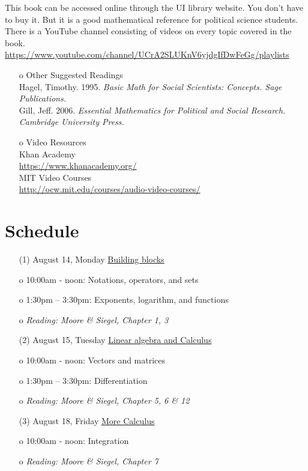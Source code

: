 \documentclass[11pt, a4paper]{article}
\begin{document}
This book can be accessed online through the UI library website. You don't have to buy it. But it is a good mathematical reference for political science students. There is a YouTube channel consisting of videos on every topic covered in the book.\\
\href{https://www.youtube.com/channel/UCrA2SLUKnV6yjdgIfDwFeGg/playlists}{https://www.youtube.com/channel/UCrA2SLUKnV6yjdgIfDwFeGg/playlists} 

\begin{itemize}
\item[o] Other Suggested Readings \\
Hagel, Timothy. 1995. {\it Basic Math for Social Scientists: Concepts. Sage Publications.} \\
Gill, Jeff. 2006. {\it Essential Mathematics for Political and Social Research. Cambridge University Press.} 

\item[o] Video Resources \\
Khan Academy \\
\href{https://www.khanacademy.org/}{https://www.khanacademy.org/} \\
MIT Video Courses \\
\href{http://ocw.mit.edu/courses/audio-video-courses/}{http://ocw.mit.edu/courses/audio-video-courses/}
\end{itemize}

\section{Schedule} 
\begin{itemize}
\item[(1)]August 14, Monday \underline{Building blocks} 
\item[o] 10:00am - noon: Notations, operators, and sets
\item[o] 1:30pm – 3:30pm: Exponents, logarithm, and functions
\item[o] {\it Reading: Moore \& Siegel, Chapter 1, 3} 
\end{itemize}

\begin{itemize}
\item[(2)]August 15, Tuesday \underline{Linear algebra and Calculus}
\item[o] 10:00am - noon: Vectors and matrices
\item[o] 1:30pm – 3:30pm: Differentiation
\item[o] {\it Reading: Moore \& Siegel, Chapter 5, 6 \& 12} 
\end{itemize}

\begin{itemize} 
\item[(3)]August 18, Friday \underline{More Calculus} 
\item[o] 10:00am - noon: Integration
\item[o] {\it Reading: Moore \& Siegel, Chapter 7} 
\end{itemize}

\end{document}

